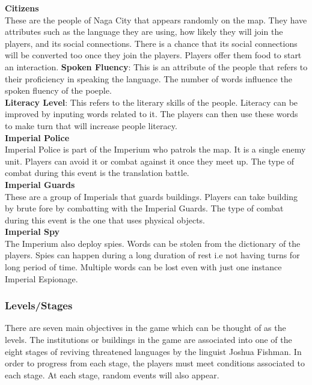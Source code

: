 \documentclass[11pt]{article}
\begin{document}
\textbf{Citizens}\\
These are the people of Naga City that appears randomly on the map. They have attributes such as the language they are using, how likely they will join the players, and its social connections. There is a chance that its social connections will be converted too once they join the players. Players offer them food to start an interaction.
\textbf{Spoken Fluency}: This is an attribute of the people that refers to their proficiency in speaking the language. The number of words influence the spoken fluency of the poeple.\\
\textbf{Literacy Level}: This refers to the literary skills of the people. Literacy can be improved by inputing words related to it. The players can then use these words to make turn that will increase people literacy.\\

\textbf{Imperial Police}\\
Imperial Police is part of the Imperium who patrols the map. It is a single enemy unit. Players can avoid it or combat against it once they meet up. The type of combat during this event is the translation battle.\\

\textbf{Imperial Guards}\\
These are a group of Imperials that guards buildings. Players can take building by brute fore by combatting with the Imperial Guards. The type of combat during this event is the one that uses physical objects.\\

\textbf{Imperial Spy}\\
The Imperium also deploy spies. Words can be stolen from the dictionary of the players. Spies can happen during a long duration of rest i.e not having turns for long period of time. Multiple words can be lost even with just one instance Imperial Espionage.\\


\subsubsection{Levels/Stages}
There are seven main objectives in the game which can be thought of as the levels. The institutions or buildings in the game are associated into one of the eight stages of reviving threatened languages by the linguist Joshua Fishman. In order to progress from each stage, the players must meet conditions associated to each stage. At each stage, random events will also appear.\\
\end{document}
